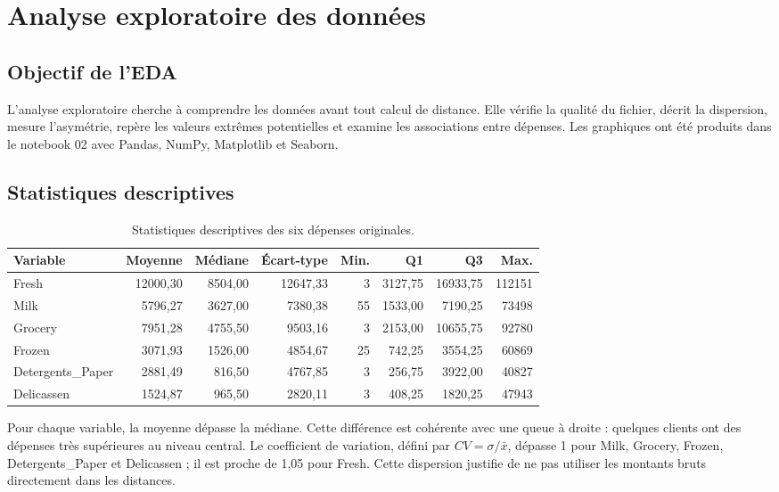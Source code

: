 \chapter{Analyse exploratoire des données}

\section{Objectif de l'EDA}
L'analyse exploratoire cherche à comprendre les données avant tout calcul de distance. Elle vérifie la qualité du fichier, décrit la dispersion, mesure l'asymétrie, repère les valeurs extrêmes potentielles et examine les associations entre dépenses. Les graphiques ont été produits dans le notebook 02 avec Pandas, NumPy, Matplotlib et Seaborn.

\section{Statistiques descriptives}
\begin{table}[H]
\centering\scriptsize
\caption{Statistiques descriptives des six dépenses originales.}
\label{tab:descriptives}
\begin{tabular}{lrrrrrrr}
\toprule
Variable & Moyenne & Médiane & Écart-type & Min. & Q1 & Q3 & Max. \\
\midrule
Fresh & 12000,30 & 8504,00 & 12647,33 & 3 & 3127,75 & 16933,75 & 112151 \\
Milk & 5796,27 & 3627,00 & 7380,38 & 55 & 1533,00 & 7190,25 & 73498 \\
Grocery & 7951,28 & 4755,50 & 9503,16 & 3 & 2153,00 & 10655,75 & 92780 \\
Frozen & 3071,93 & 1526,00 & 4854,67 & 25 & 742,25 & 3554,25 & 60869 \\
Detergents\_Paper & 2881,49 & 816,50 & 4767,85 & 3 & 256,75 & 3922,00 & 40827 \\
Delicassen & 1524,87 & 965,50 & 2820,11 & 3 & 408,25 & 1820,25 & 47943 \\
\bottomrule
\end{tabular}
\end{table}

Pour chaque variable, la moyenne dépasse la médiane. Cette différence est cohérente avec une queue à droite : quelques clients ont des dépenses très supérieures au niveau central. Le coefficient de variation, défini par $CV=\sigma/\bar{x}$, dépasse 1 pour Milk, Grocery, Frozen, Detergents\_Paper et Delicassen ; il est proche de 1,05 pour Fresh. Cette dispersion justifie de ne pas utiliser les montants bruts directement dans les distances.

